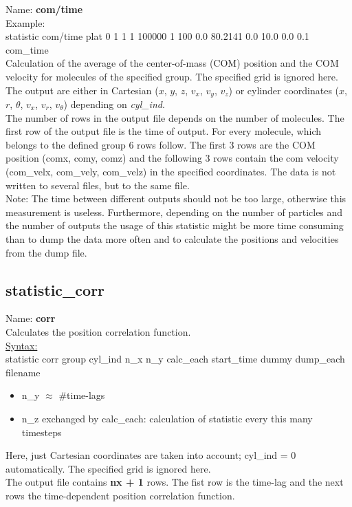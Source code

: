 \documentclass[a4paper,10pt]{scrreprt}
\begin{document}
Name: {\bfseries com/time}\\[2ex]
Example:\\[0.5ex]
statistic       com/time plat 0 1 1 1 100000 1 100 0.0 80.2141 0.0 10.0 0.0 0.1 com\_time
\\[2ex]
Calculation of the average of the center-of-mass (COM) position and the COM velocity for molecules of the specified group.
The specified grid is ignored here.
\\[2ex]
The output are either in Cartesian ($x$, $y$, $z$, $v_x$, $v_y$, $v_z$) or cylinder coordinates ($x$, $r$, $\theta$, $v_x$, $v_r$, $v_{\theta}$) depending on \textit{cyl\_ind}.
\\[2ex]
The number of rows in the output file depends on the number of molecules. 
The first row of the output file is the time of output.
For every molecule, which belongs to the defined group 6 rows follow.
The first 3 rows are the COM position (comx, comy, comz) and the following 3 rows contain the com velocity (com\_velx, com\_vely, com\_velz) in the specified coordinates.
The data is not written to several files, but to the same file.
\\[2ex]
Note: The time between different outputs should not be too large, otherwise this measurement is useless.
Furthermore, depending on the number of particles and the number of outputs the usage of this statistic might be more time consuming than to dump the data more often and to calculate the positions and velocities from the dump file.


\subsection{statistic\_corr}

Name: {\bfseries corr}
\\[2ex]
Calculates the position correlation function.
\\[2ex]
\underline{Syntax:}\\
statistic	corr group cyl\_ind n\_x n\_y calc\_each start\_time dummy dump\_each filename
\begin{itemize}
\item n\_y $\approx$ \#time-lags
\item n\_z exchanged by calc\_each: calculation of statistic every this many timesteps
\end{itemize} 
Here, just Cartesian coordinates are taken into account; cyl\_ind = 0 automatically.
The specified grid is ignored here.
\\[2ex]
The output file contains {\bfseries nx + 1} rows.
The fist row is the time-lag and the next rows the time-dependent position correlation function.
\end{document}
